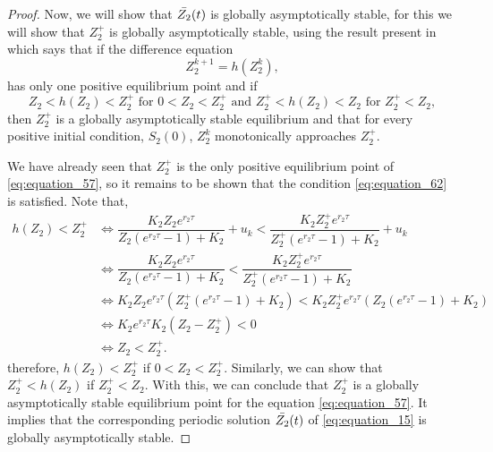 \documentclass[10pt,letterpaper]{article}
\begin{document}
\begin{proof}
Now, we will show that $\Bar{Z_2}(t)$ is globally asymptotically stable, for this we will show that $Z_2^+$ is globally asymptotically stable, using the result present in \cite{CULL1981} which says that if the difference equation $$Z_2^{k+1} = h(Z_2 ^k),$$ has only one positive equilibrium point and if 
\begin{equation}\label{eq:equation_62}
    Z_2<h(Z_2)<Z_2^+ \text{ for } 0<Z_2<Z_2^+ \text{ and } Z_2^+<h(Z_2)<Z_2 \text{ for } Z_2^+<Z_2,
\end{equation}then $Z_2^+$ is a globally asymptotically stable equilibrium and that for every positive initial condition, $S_2(0)$, $Z_2^k$ monotonically approaches $Z_2^+$.

We have already seen that $Z_2^+$ is the only positive equilibrium point of \eqref{eq:equation_57}, so it remains to be shown that the condition \eqref{eq:equation_62} is satisfied. Note that,
\begin{align}\label{eq:equation_63}
     h(Z_2) < Z_2^+ &\Longleftrightarrow \dfrac{K_2 Z_2 e^{r_2 \tau}}{Z_2\left(e^{r_2 \tau} -1\right)+K_2} + u_k < \dfrac{K_2 Z_2^+ e^{r_2 \tau}}{Z_2^+\left(e^{r_2 \tau} -1\right)+K_2} + u_k\\\nonumber
     &\Longleftrightarrow \dfrac{K_2 Z_2 e^{r_2 \tau}}{Z_2\left(e^{r_2 \tau} -1\right)+K_2} < \dfrac{K_2 Z_2^+ e^{r_2 \tau}}{Z_2^+\left(e^{r_2 \tau} -1\right)+K_2}\\\nonumber
     &\Longleftrightarrow K_2 Z_2 e^{r_2 \tau}\left(Z_2^+\left(e^{r_2 \tau} -1\right)+K_2\right)< K_2 Z_2^+ e^{r_2 \tau}\left(Z_2\left(e^{r_2 \tau} -1\right)+K_2\right)\\\nonumber
     &\Longleftrightarrow K_2 e^{r_2 \tau}K_2 \left(Z_2 - Z_2^+\right)<0\\\nonumber
    &\Longleftrightarrow Z_2<Z_2^+.
\end{align}therefore, $h(Z_2)<Z_2^+$ if $0<Z_2<Z_2^+$. Similarly, we can show that $Z_2^+<h(Z_2)$ if $Z_2^+<Z_2$. With this, we can conclude that $Z_2^+$ is a globally asymptotically stable equilibrium point for the equation \eqref{eq:equation_57}. It implies that the corresponding periodic solution $\Bar{Z_2}(t)$ of \eqref{eq:equation_15} is globally asymptotically stable.
\end{proof}
\end{document}
